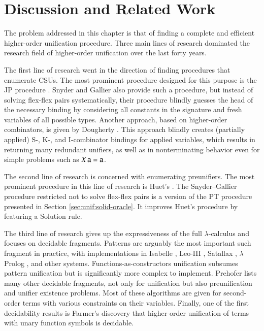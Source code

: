 \section{Discussion and Related Work}
The problem addressed in this chapter is that of finding
a complete and efficient higher-order unification procedure. Three main lines of
research dominated the research field of higher-order unification over the last forty years. 

The first line of research went in the direction of finding procedures that
enumerate CSUs. The most prominent procedure designed for
this purpose is the JP procedure \cite{jp-76-unif}. Snyder and Gallier
\cite{sg-89-unif} also provide such a procedure,
but instead of solving
flex-flex pairs systematically, their procedure blindly guesses the head of the necessary
binding by considering all constants in the signature and fresh variables of all
possible types. Another approach, based on higher-order combinators, is given by
Dougherty \cite{dd-93-comb-unif}. This approach blindly creates (partially
applied) \textsf{S}-, \textsf{K}-, and \textsf{I}-combinator bindings for applied
variables, which results in returning many redundant unifiers, as well as in
nonterminating behavior even for simple problems such as $X \, \mathsf{a} =
\mathsf{a}$.

The second line of research is concerned with enumerating
preunifiers. The most prominent procedure in this line of research is Huet's 
\cite{gh-75-unification}. The Snyder--Gallier procedure restricted not to solve flex-flex pairs
is a version of the PT procedure presented in Section \ref{sec:unif:solid-oracle}. It improves 
Huet's procedure by featuring a Solution rule.

The third line of research gives up the expressiveness of the full
$\lambda$-calculus and focuses on decidable fragments. Patterns
\cite{tn-93-patterns} are arguably the most important such fragment in practice,
with implementations
in Isabelle \cite{tn-02-isabelle}, Leo-III \cite{sb-21-leo3}, Satallax
\cite{cb-12-satallax}, $\lambda$Prolog \cite{dm-12-lprolog}, and other systems.
Functions-as-constructors \cite{tl-16-facunif} unification subsumes pattern
unification but is significantly more complex to implement. Prehofer
\cite{cp-95-unifphd} lists many other decidable fragments, not only for
unification but also preunification and unifier existence problems. Most of
these algorithms are given for second-order terms with various constraints on
their variables. Finally, one of the first decidability results is Farmer's discovery \cite{wf-88-monadicunif} that
higher-order unification of terms with unary function symbols is decidable.

